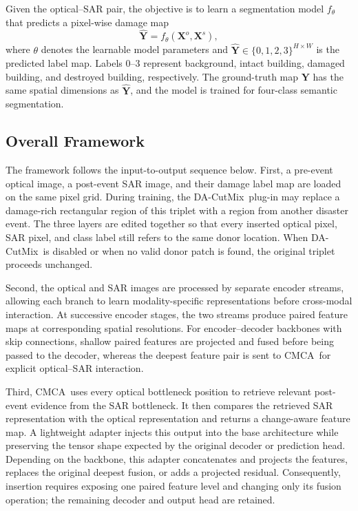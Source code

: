 \documentclass[journal]{IEEEtran}
\newcommand{\cmca}{CMCA}
\newcommand{\dacutmix}{DA-CutMix}
\begin{document}
    Given the optical--SAR pair, the objective is to learn a segmentation model $f_{\theta}$ that predicts a pixel-wise damage map
    \begin{equation}
        \hat{\mathbf{Y}}=f_{\theta}
        \left(\mathbf{X}^{o},\mathbf{X}^{s}\right),
        \label{eq:problem_formulation}
    \end{equation}
    where $\theta$ denotes the learnable model parameters and $\hat{\mathbf{Y}}\in\{0,1,2,3\}^{H\times W}$ is the predicted label map. Labels 0--3 represent background, intact building, damaged building, and destroyed building, respectively. The ground-truth map $\mathbf{Y}$ has the same spatial dimensions as $\hat{\mathbf{Y}}$, and the model is trained for four-class semantic segmentation. 
    
    \subsection{Overall Framework}
    \label{subsec:framework}
    
    The framework follows the input-to-output sequence below. First, a pre-event optical image, a post-event SAR image, and their damage label map are loaded on the same pixel grid. During training, the \dacutmix\ plug-in may replace a damage-rich rectangular region of this triplet with a region from another disaster event. The three layers are edited together so that every inserted optical pixel, SAR pixel, and class label still refers to the same donor location. When \dacutmix\ is disabled or when no valid donor patch is found, the original triplet proceeds unchanged.
    
    Second, the optical and SAR images are processed by separate encoder streams, allowing each branch to learn modality-specific representations before cross-modal interaction. At successive encoder stages, the two streams produce paired feature maps at corresponding spatial resolutions. For encoder--decoder backbones with skip connections, shallow paired features are projected and fused before being passed to the decoder, whereas the deepest feature pair is sent to \cmca\ for explicit optical--SAR interaction.
    
    
    Third, \cmca\ uses every optical bottleneck position to retrieve relevant post-event evidence from the SAR bottleneck. It then compares the retrieved SAR representation with the optical representation and returns a change-aware feature map. A lightweight adapter injects this output into the base architecture while preserving the tensor shape expected by the original decoder or prediction head. Depending on the backbone, this adapter concatenates and projects the features, replaces the original deepest fusion, or adds a projected residual. Consequently, insertion requires exposing one paired feature level and changing only its fusion operation; the remaining decoder and output head are retained.
    
\end{document}
